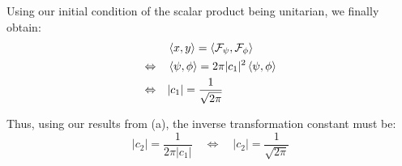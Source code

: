 \documentclass[a4paper,german,12pt,smallheadings]{scrartcl}
\begin{document}
\begin{enumerate}[a)]
Using our initial condition of the scalar product being unitarian, we finally obtain:
\begin{align*}
&\braket{x,y}=\braket{\mathcal{F}_{\psi},\mathcal{F}_{\phi}}\\
\Leftrightarrow \quad &\braket{\psi,\phi}=2\pi|c_1|^2\braket{\psi,\phi}\\
\Leftrightarrow \quad &|c_1|=\frac{1}{\sqrt{2\pi}}
\end{align*}

Thus, using our results from (a), the inverse transformation constant must be:
\begin{equation*}
|c_2|=\frac{1}{2\pi |c_1|} \quad \Leftrightarrow \quad |c_2|=\frac{1}{\sqrt{2\pi}}
\end{equation*}

\end{enumerate}
\end{document}

